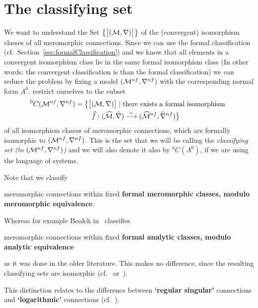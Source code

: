 \section{The classifying set}\label{sec:classifyingSet}
We want to understand the Set
$\bigl\{\big[(\mathcal{M},\nabla)\big]\bigr\}$ of the (convergent)
isomorphism classes of all meromorphic connections. Since we can use the formal
classification (cf.\ Section~\ref{sec:formalClassification}) and we know that
all elements in a convergent isomorphism class lie in the same formal
isomorphism class (In other words: the convergent classification is
 than the formal classification) we can reduce the problem by
fixing a model $(\mathcal{M}^{nf},\nabla^{nf})$ with the corresponding normal form
$A^0$.
 restrict ourselves to the subset
\begin{multline*}
  {}^0C(\mathcal{M}^{nf},\nabla^{nf})=\bigl\{
    \bigl[(\mathcal{M},\nabla)\bigr]
    \mid \text{there exists a formal isomorphism }
  \\\qquad\widehat f:(\widehat{\mathcal{M}},\widehat\nabla)
      \overset{\sim}\longrightarrow
      (\widehat{\mathcal{M}}^{nf},\widehat\nabla^{nf})
  \bigr\}
\end{multline*}
of all isomorphism classes of meromorphic connections, which are formally
isomorphic to $(\mathcal{M}^{nf},\nabla^{nf})$. This is the set that we will be
calling the \emph{classifying set (to $(\mathcal{M}^{nf},\nabla^{nf})$)} and we will
also denote it also by ${}^0C(A^0)$, if we are using the language of systems.
\begin{rem}
  Note that we classify
  \begin{einr}
    meromorphic connections within fixed \textbf{formal meromorphic classes,
    modulo meromorphic equivalence}.
  \end{einr}
  Whereas for example Boalch in~\cite{boalch,thboalch} classifies
  \begin{einr}
    meromorphic connections within fixed \textbf{formal analytic classes,
    modulo analytic equivalence}
  \end{einr}
  as it was done in the older literature.
  This makes no difference, since the resulting classifying sets are isomorphic
  (cf.~\cite{thboalch} or~\cite{babbitt1989local}).

  This distinction relates to the difference between \textbf{‘regular
  singular’} connections and \textbf{‘logarithmic’} connections
  (cf.~\cite[Rem.1.41]{thboalch}).
\end{rem}
